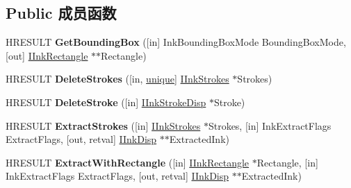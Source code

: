 \subsection*{Public 成员函数}
\begin{DoxyCompactItemize}
\item 
\mbox{\label{interface_m_s_i_n_k_a_u_t_lib_1_1_i_ink_disp_aac563f5126738891e91bbbc57b14857d}} 
H\+R\+E\+S\+U\+LT {\bfseries Get\+Bounding\+Box} (\mbox{[}in\mbox{]} Ink\+Bounding\+Box\+Mode Bounding\+Box\+Mode, \mbox{[}out\mbox{]} \hyperlink{interface_m_s_i_n_k_a_u_t_lib_1_1_i_ink_rectangle}{I\+Ink\+Rectangle} $\ast$$\ast$Rectangle)
\item 
\mbox{\label{interface_m_s_i_n_k_a_u_t_lib_1_1_i_ink_disp_a7bde05178c4951ed30ace68ce5fabfa9}} 
H\+R\+E\+S\+U\+LT {\bfseries Delete\+Strokes} (\mbox{[}in, \hyperlink{interfaceunique}{unique}\mbox{]} \hyperlink{interface_m_s_i_n_k_a_u_t_lib_1_1_i_ink_strokes}{I\+Ink\+Strokes} $\ast$Strokes)
\item 
\mbox{\label{interface_m_s_i_n_k_a_u_t_lib_1_1_i_ink_disp_a549973b9486622c5cf9d1e2eef654cf8}} 
H\+R\+E\+S\+U\+LT {\bfseries Delete\+Stroke} (\mbox{[}in\mbox{]} \hyperlink{interface_m_s_i_n_k_a_u_t_lib_1_1_i_ink_stroke_disp}{I\+Ink\+Stroke\+Disp} $\ast$Stroke)
\item 
\mbox{\label{interface_m_s_i_n_k_a_u_t_lib_1_1_i_ink_disp_a4fb704718fb632eb7ee27337767aa51b}} 
H\+R\+E\+S\+U\+LT {\bfseries Extract\+Strokes} (\mbox{[}in\mbox{]} \hyperlink{interface_m_s_i_n_k_a_u_t_lib_1_1_i_ink_strokes}{I\+Ink\+Strokes} $\ast$Strokes, \mbox{[}in\mbox{]} Ink\+Extract\+Flags Extract\+Flags, \mbox{[}out, retval\mbox{]} \hyperlink{interface_m_s_i_n_k_a_u_t_lib_1_1_i_ink_disp}{I\+Ink\+Disp} $\ast$$\ast$Extracted\+Ink)
\item 
\mbox{\label{interface_m_s_i_n_k_a_u_t_lib_1_1_i_ink_disp_a05811efae68958b14e792aefd9760110}} 
H\+R\+E\+S\+U\+LT {\bfseries Extract\+With\+Rectangle} (\mbox{[}in\mbox{]} \hyperlink{interface_m_s_i_n_k_a_u_t_lib_1_1_i_ink_rectangle}{I\+Ink\+Rectangle} $\ast$Rectangle, \mbox{[}in\mbox{]} Ink\+Extract\+Flags Extract\+Flags, \mbox{[}out, retval\mbox{]} \hyperlink{interface_m_s_i_n_k_a_u_t_lib_1_1_i_ink_disp}{I\+Ink\+Disp} $\ast$$\ast$Extracted\+Ink)
$$
\end{DoxyCompactItemize}

